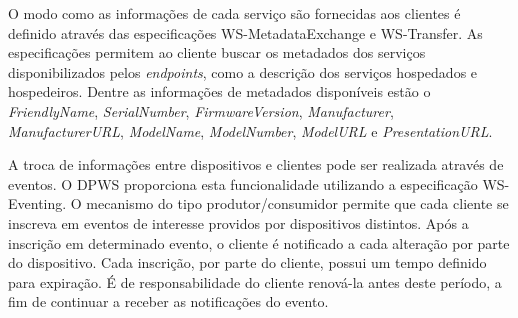 O modo como as informações de cada serviço são fornecidas aos clientes é definido através das
especificações {WS-MetadataExchange} e {WS-Transfer}. As especificações permitem ao cliente buscar
os metadados dos serviços disponibilizados pelos \textit{endpoints}, como a descrição dos serviços
hospedados e hospedeiros. Dentre as informações de metadados disponíveis estão o
\emph{FriendlyName}, \emph{SerialNumber}, \emph{FirmwareVersion}, \emph{Manufacturer},
\emph{ManufacturerURL}, \emph{ModelName}, \emph{ModelNumber}, \emph{ModelURL} e
\emph{PresentationURL}.

A troca de informações entre dispositivos e clientes pode ser realizada através de eventos. O
\gls{DPWS} proporciona esta funcionalidade utilizando a especificação {WS-Eventing}. O mecanismo do
tipo produtor/consumidor permite que cada cliente se inscreva em eventos de interesse providos por
dispositivos distintos. Após a inscrição em determinado evento, o cliente é notificado a cada
alteração por parte do dispositivo. Cada inscrição, por parte do cliente, possui um tempo definido
para expiração. É de responsabilidade do cliente renová-la antes deste período, a fim de continuar a
receber as notificações do evento.
